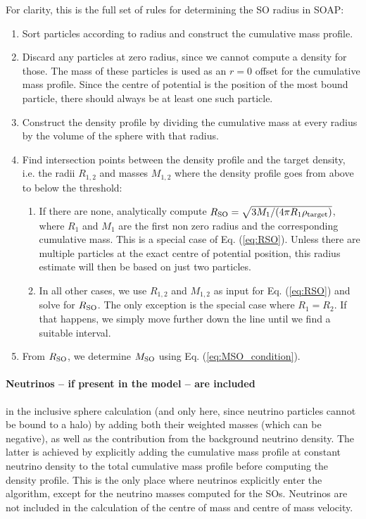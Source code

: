 \documentclass{article}
\begin{document}
For clarity, this is the full set of rules for determining the SO radius in SOAP:
\begin{enumerate}
    \item Sort particles according to radius and construct the cumulative mass profile.
    \item Discard any particles at zero radius, since we cannot compute a density for those. The mass of these 
    particles is used as an $r=0$ offset for the cumulative mass profile. Since the centre of potential is the 
    position of the most bound particle, there should always be at least one such particle.
    \item Construct the density profile by dividing the cumulative mass at every radius by the volume of the 
    sphere with that radius.
    \item Find intersection points between the density profile and the target density, i.e. the radii 
    $R_{1,2}$ and masses $M_{1,2}$ where the density profile goes from above to below the threshold:
    \begin{enumerate}
        \item If there are none, analytically compute $R_{\rm{}SO}=\sqrt{3M_1/(4\pi{}R_1\rho_{\rm{}target})}$, 
        where $R_1$ and $M_1$ are the first non zero radius and the corresponding cumulative mass. This is a 
        special case of Eq. (\ref{eq:RSO}). Unless there are multiple particles at the exact centre of potential 
        position, this radius estimate will then be based on just two particles.
        \item In all other cases, we use $R_{1,2}$ and $M_{1,2}$ as input for Eq. (\ref{eq:RSO}) and solve for 
        $R_{\rm{}SO}$. The only exception is the special case where $R_1 = R_2$. If that happens, we simply 
        move further down the line until we find a suitable interval.

    \end{enumerate}
    \item From $R_{\rm{}SO}$, we determine $M_{\rm{}SO}$ using Eq. (\ref{eq:MSO_condition}).
\end{enumerate}

\paragraph{Neutrinos -- if present in the model -- are included} in the inclusive sphere calculation (and only 
here, since neutrino particles cannot be bound to a halo) by adding both their weighted masses (which can be 
negative), as well as the contribution from the background neutrino density. The latter is achieved by 
explicitly adding the cumulative mass profile at constant neutrino density to the total cumulative mass 
profile before computing the density profile. This is the only place where neutrinos explicitly enter the 
algorithm, except for the neutrino masses computed for the SOs. Neutrinos are not included in the calculation 
of the centre of mass and centre of mass velocity.
\end{document}
